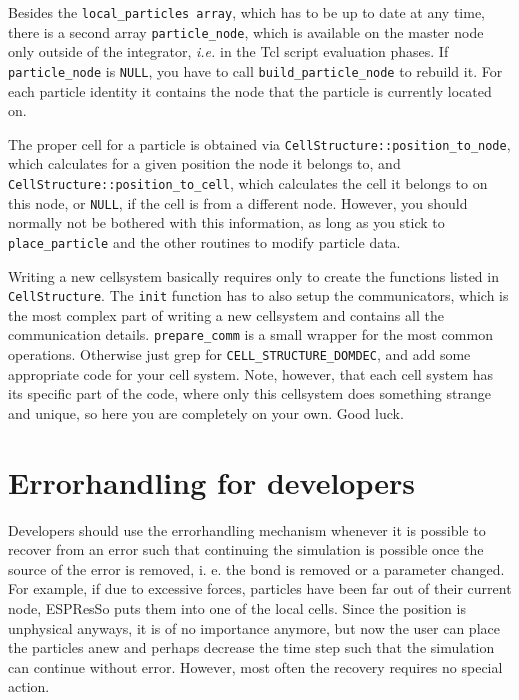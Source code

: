 \documentclass[
a4paper,                        %
11pt,                           %
twoside,                        %
footsepline,                    %
headsepline,                    %
headexclude,                    %
footexclude,                    %
pagesize,                       %
bibtotocnumbered,               %
idxtotoc                        %
]{scrreprt}
\newcommand{\es}{\mbox{\textsf{ESPResSo}}\xspace}
\newcommand{\ie}{\textit{i.e.}\xspace}
\begin{document}
Besides the \verb!local_particles array!, which has to be up to date
at any time, there is a second array \verb!particle_node!, which is
available on the master node only outside of the integrator, \ie in
the Tcl script evaluation phases. If \verb!particle_node! is
\verb!NULL!, you have to call \verb!build_particle_node! to rebuild
it. For each particle identity it contains the node that the particle
is currently located on.
	
The proper cell for a particle is obtained via
\verb!CellStructure::position_to_node!, which calculates for a given
position the node it belongs to, and
\verb!CellStructure::position_to_cell!, which calculates the cell it
belongs to on this node, or \verb!NULL!, if the cell is from a
different node.  However, you should normally not be bothered with
this information, as long as you stick to \verb!place_particle! and
the other routines to modify particle data.

Writing a new cellsystem basically requires only to create the
functions listed in \verb!CellStructure!. The \verb!init! function has
to also setup the communicators, which is the most complex part of
writing a new cellsystem and contains all the communication
details. \verb!prepare_comm! is a small wrapper for the most common
operations. Otherwise just grep for \verb!CELL_STRUCTURE_DOMDEC!, and
add some appropriate code for your cell system. Note, however, that
each cell system has its specific part of the code, where only this
cellsystem does something strange and unique, so here you are
completely on your own. Good luck.

\section{Errorhandling for developers}

Developers should use the errorhandling mechanism whenever it is
possible to recover from an error such that continuing the simulation
is possible once the source of the error is removed, i. e. the bond is
removed or a parameter changed. For example, if due to excessive
forces, particles have been far out of their current node, \es
puts them into one of the local cells. Since the position is
unphysical anyways, it is of no importance anymore, but now the user
can place the particles anew and perhaps decrease the time step such
that the simulation can continue without error. However, most often
the recovery requires no special action.
\end{document}
